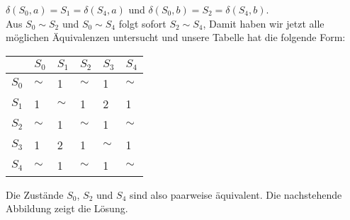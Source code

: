 \documentclass{article}
\begin{document}
\begin{enumerate}
\begin{enumerate}
            \hspace*{1.3cm}
            $\delta(S_0,a) = S_1 = \delta(S_4,a)$ \quad und 
            $\delta(S_0,b) = S_2 = \delta(S_4,b)$.
            \\[0.2cm]
            Aus $S_0 \sim S_2$ und $S_0 \sim S_4$ folgt sofort $S_2 \sim S_4$,
            Damit haben wir jetzt alle m\"oglichen \"Aquivalenzen untersucht und unsere
            Tabelle hat die folgende Form:
            \begin{center}        
            \begin{tabular}[t]{|l||l|l|l|l|l|}
            \hline
                  &$S_0$&$S_1$&$S_2$&$S_3$&$S_4$ \\
            \hline
            \hline
            $S_0$ &$\sim$&  1  &$\sim$&  1  &$\sim$ \\
            \hline
            $S_1$ &  1  &$\sim$&  1  &  2  &  1  \\
            \hline
            $S_2$ &$\sim$&  1  &$\sim$&  1  &$\sim$ \\
            \hline
            $S_3$ &  1  &  2  &  1  &$\sim$&  1  \\
            \hline
            $S_4$ &$\sim$&  1  &$\sim$&  1  &$\sim$\\            
            \hline
            \end{tabular}
            \end{center}
      \end{enumerate}
      Die Zust\"ande $S_0$, $S_2$ und $S_4$ sind also paarweise \"aquivalent.
      Die nachstehende Abbildung zeigt die L\"osung.  

\end{enumerate}
\end{document}
